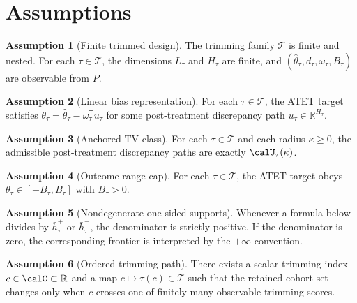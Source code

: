 \documentclass[11pt]{article}
\newcommand{\transpose}{\mathsf{T}}
\newcommand{\R}{\mathbb{R}}
\theoremstyle{definition}
\newtheorem{assumption}{Assumption}
\theoremstyle{plain}
\theoremstyle{remark}
\begin{document}
\section{Assumptions}
\begin{assumption}[Finite trimmed design]\label{ass:finite}
The trimming family \(\mathcal T\) is finite and nested. For each \(\tau\in\mathcal T\), the dimensions \(L_\tau\) and \(H_\tau\) are finite, and \((\hat\theta_\tau,d_\tau,\omega_\tau,B_\tau)\) are observable from \(P\).
\end{assumption}

\begin{assumption}[Linear bias representation]\label{ass:linear}
For each \(\tau\in\mathcal T\), the ATET target satisfies \(\theta_\tau=\hat\theta_\tau-\omega_\tau^\transpose u_\tau\) for some post-treatment discrepancy path \(u_\tau\in\R^{H_\tau}\).
\end{assumption}

\begin{assumption}[Anchored TV class]\label{ass:tv}
For each \(\tau\in\mathcal T\) and each radius \(\kappa\ge 0\), the admissible post-treatment discrepancy paths are exactly \(\calU_\tau(\kappa)\).
\end{assumption}

\begin{assumption}[Outcome-range cap]\label{ass:range}
For each \(\tau\in\mathcal T\), the ATET target obeys \(\theta_\tau\in[-B_\tau,B_\tau]\) with \(B_\tau>0\).
\end{assumption}

\begin{assumption}[Nondegenerate one-sided supports]\label{ass:nonsat}
Whenever a formula below divides by \(\bar h_\tau^{+}\) or \(\bar h_\tau^{-}\), the denominator is strictly positive. If the denominator is zero, the corresponding frontier is interpreted by the \(+\infty\) convention.
\end{assumption}

\begin{assumption}[Ordered trimming path]\label{ass:trimpath}
There exists a scalar trimming index \(c\in\calC\subset\R\) and a map \(c\mapsto\tau(c)\in\mathcal T\) such that the retained cohort set changes only when \(c\) crosses one of finitely many observable trimming scores.
\end{assumption}
\end{document}
